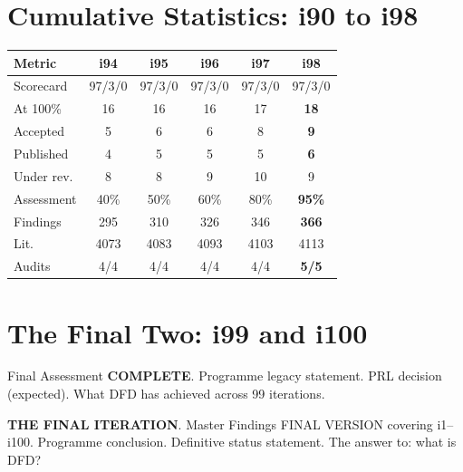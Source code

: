 \documentclass[11pt,a4paper]{article}
\begin{document}
\section{Cumulative Statistics: i90 to i98}

\begin{center}
\begin{tabular}{lccccc}
\toprule
\textbf{Metric} & \textbf{i94} & \textbf{i95} & \textbf{i96} & \textbf{i97} & \textbf{i98} \\
\midrule
Scorecard & 97/3/0 & 97/3/0 & 97/3/0 & 97/3/0 & 97/3/0 \\
At 100\% & 16 & 16 & 16 & 17 & \textbf{18} \\
Accepted & 5 & 6 & 6 & 8 & \textbf{9} \\
Published & 4 & 5 & 5 & 5 & \textbf{6} \\
Under rev. & 8 & 8 & 9 & 10 & 9 \\
Assessment & 40\% & 50\% & 60\% & 80\% & \textbf{95\%} \\
Findings & 295 & 310 & 326 & 346 & \textbf{366} \\
Lit. & 4073 & 4083 & 4093 & 4103 & 4113 \\
Audits & 4/4 & 4/4 & 4/4 & 4/4 & \textbf{5/5} \\
\bottomrule
\end{tabular}
\end{center}

\section{The Final Two: i99 and i100}

\begin{tcolorbox}[colback=blue!5!white, colframe=dfdblue, title=\textbf{THE FINAL TWO ITERATIONS}]
\begin{description}[nosep]
\item[i99:] Final Assessment \textbf{COMPLETE}. Programme legacy statement. PRL decision (expected). What DFD has achieved across 99 iterations.

\item[i100:] \textbf{THE FINAL ITERATION}. Master Findings FINAL VERSION covering i1--i100. Programme conclusion. Definitive status statement. The answer to: what is DFD?
\end{description}
\end{tcolorbox}
\end{document}
